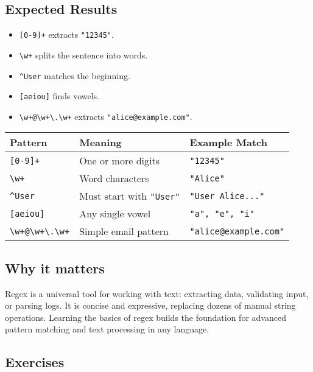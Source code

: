 \documentclass[
  letterpaper,
  DIV=11,
  numbers=noendperiod]{scrreprt}
\providecommand{\tightlist}{%
  \setlength{\itemsep}{0pt}\setlength{\parskip}{0pt}}
\begin{document}
\subsection{Expected Results}\label{expected-results-4}

\begin{itemize}
\tightlist
\item
  \texttt{{[}0-9{]}+} extracts \texttt{"12345"}.
\item
  \texttt{\textbackslash{}w+} splits the sentence into words.
\item
  \texttt{\^{}User} matches the beginning.
\item
  \texttt{{[}aeiou{]}} finds vowels.
\item
  \texttt{\textbackslash{}w+@\textbackslash{}w+\textbackslash{}.\textbackslash{}w+}
  extracts \texttt{"alice@example.com"}.
\end{itemize}

\begin{longtable}[]{@{}lll@{}}
\toprule\noalign{}
Pattern & Meaning & Example Match \\
\midrule\noalign{}
\endhead
\bottomrule\noalign{}
\endlastfoot
\texttt{{[}0-9{]}+} & One or more digits & \texttt{"12345"} \\
\texttt{\textbackslash{}w+} & Word characters & \texttt{"Alice"} \\
\texttt{\^{}User} & Must start with \texttt{"User"} &
\texttt{"User\ Alice..."} \\
\texttt{{[}aeiou{]}} & Any single vowel & \texttt{"a",\ "e",\ "i"} \\
\texttt{\textbackslash{}w+@\textbackslash{}w+\textbackslash{}.\textbackslash{}w+}
& Simple email pattern & \texttt{"alice@example.com"} \\
\end{longtable}

\subsection{Why it matters}\label{why-it-matters-49}

Regex is a universal tool for working with text: extracting data,
validating input, or parsing logs. It is concise and expressive,
replacing dozens of manual string operations. Learning the basics of
regex builds the foundation for advanced pattern matching and text
processing in any language.

\subsection{Exercises}\label{exercises-48}
\end{document}
